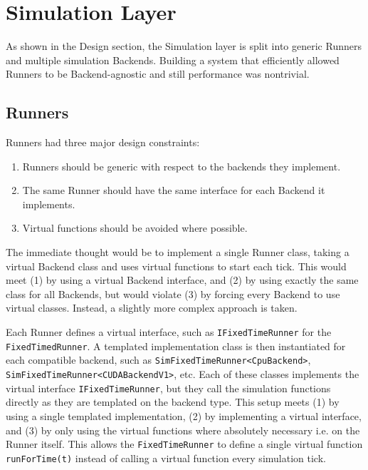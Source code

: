 \section{Simulation Layer}
As shown in the Design section, the Simulation layer is split into generic Runners and multiple simulation Backends.
Building a system that efficiently allowed Runners to be Backend-agnostic and still performance was nontrivial.

\subsection{Runners}
Runners had three major design constraints:
\begin{enumerate}
    \item Runners should be generic with respect to the backends they implement.
    \item The same Runner should have the same interface for each Backend it implements.
    \item Virtual functions should be avoided where possible.
\end{enumerate}
The immediate thought would be to implement a single Runner class, taking a virtual Backend class and uses virtual functions to start each tick.
This would meet (1) by using a virtual Backend interface, and (2) by using exactly the same class for all Backends, but would violate (3) by forcing every Backend to use virtual classes.
Instead, a slightly more complex approach is taken.

Each Runner defines a virtual interface, such as \texttt{IFixedTimeRunner} for the \texttt{FixedTimedRunner}.
A templated implementation class is then instantiated for each compatible backend, such as \texttt{SimFixedTimeRunner<CpuBackend>}, \texttt{SimFixedTimeRunner<CUDABackendV1>}, etc.
Each of these classes implements the virtual interface \texttt{IFixedTimeRunner}, but they call the simulation functions directly as they are templated on the backend type.
This setup meets (1) by using a single templated implementation, (2) by implementing a virtual interface, and (3) by only using the virtual functions where absolutely necessary i.e. on the Runner itself.
This allows the \texttt{FixedTimeRunner} to define a single virtual function \texttt{runForTime(t)} instead of calling a virtual function every simulation tick.

